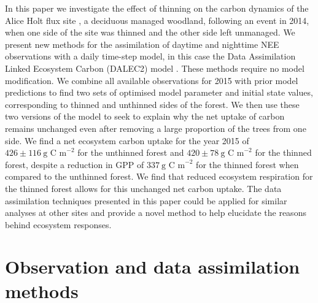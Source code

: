 In this paper we investigate the effect of thinning on the carbon dynamics of the Alice Holt flux site \citep{wilkinson2012inter}, a deciduous managed woodland, following an event in 2014, when one side of the site was thinned and the other side left unmanaged. 
We present new methods for the assimilation of daytime and nighttime NEE observations with a daily time-step model, in this case the Data Assimilation Linked Ecosystem Carbon (DALEC2) model \citep{Bloom2015}. These methods require no model modification. We combine all available observations for 2015 with prior model predictions to find two sets of optimised model parameter and initial state values, corresponding to thinned and unthinned sides of the forest. We then use these two versions of the model to seek to explain why the net uptake of carbon remains unchanged even after removing a large proportion of the trees from one side. We find a net ecosystem carbon uptake for the year 2015 of \(426 \pm 116~\text{g C m}^{-2}\) for the unthinned forest and \(420 \pm 78~\text{g C m}^{-2}\) for the thinned forest, despite a reduction in GPP of \(337~\text{g C m}^{-2}\) for the thinned forest when compared to the unthinned forest. We find that reduced ecosystem respiration for the thinned forest allows for this unchanged net carbon uptake. The data assimilation techniques presented in this paper could be applied for similar analyses at other sites and provide a novel method to help elucidate the reasons behind ecosystem responses.      

\section{Observation and data assimilation methods}

